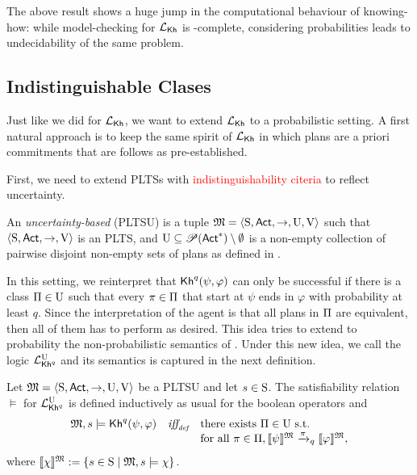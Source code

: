 The above result shows a huge jump in the computational behaviour of
knowing-how: while model-checking for $\Khlogic$ is \PSPACE-complete,
considering probabilities leads to undecidability of the same problem.


\subsection{Indistinguishable Clases}

Just like we did for $\Khlogic$, we want to extend $\Khunc$ to a
probabilistic setting.  A first natural approach is to keep the same
spirit of $\Khlogic$ in which plans are a priori commitments that are
follows as pre-established.

First, we need to extend PLTSs with \textcolor{red}{indistinguishability citeria} to
reflect uncertainty.

\begin{definition}\label{def:pltsu}
    An \emph{uncertainty-based \lts} (PLTSU) is a tuple
    $\model=\tup{\S,\Act,\ra,\Unc,\V}$ such that
    $\tup{\S,\Act,\ra,\V}$ is an PLTS, and $\Unc\subseteq
    \powerset(\Act^*)\setminus \emptyset$ is a non-empty collection of
    pairwise disjoint non-empty sets of plans as defined in
    .
\end{definition}

In this setting, we reinterpret that $\kh^q(\psi,\varphi)$ can only be
successful if there is a class $\plans\in\Unc$ such that every
$\plan\in\plans$ that start at $\psi$ ends in $\varphi$ with
probability at least $q$.  Since the interpretation of the agent is
that all plans in $\plans$ are equivalent, then all of them has to
perform as desired.  This idea tries to extend to probability the
non-probabilistic semantics of .
Under this new idea, we call the logic $\PKhunc$ and its semantics is
captured in the next definition.


\begin{definition}\label{def:semantics:PKhunc}
  Let $\model = \tup{\S,\Act,\ra,\Unc,\V}$ be a PLTSU and let $s\in\S$.  The
  satisfiability relation $\models$ for $\PKhunc$ is defined inductively 
  as usual for the boolean operators and
  \[
  \begin{array}{l@{\ \ \ }c@{\ \ \  }l}
    \model, s \models \kh^q(\psi,\varphi) & \iffdef &  \text{there exists } {\plans \in \Unc} \text{ s.t.} \\
    & & \text{for all } {\plan\in\plans}, {\truthset{\model}{\psi} \reach{\plan}_q \truthset{\model}{\varphi}}, 
  \end{array}
  \]    
  where $\truthset{\model}{\chi} := \csetsc{s\in\S}{\model,s\models\chi}$.
\end{definition}

